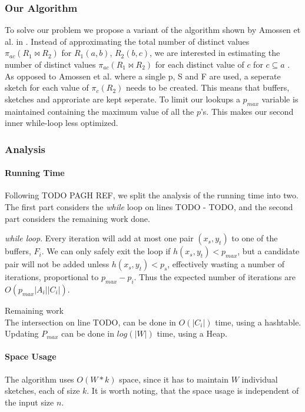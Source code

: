 \documentclass[a4paper,11pt]{article}
\begin{document}
\subsubsection{Our Algorithm}
To solve our problem we propose a variant of the algorithm shown by Amossen et al. in \cite{paper:Amossen}. Instead of approximating the total number of distinct values $\pi_{ac}(R_1 \Join R_2)$ for $R_1(a,b)$, $R_2(b,c)$, we are interested in estimating the number of distinct values $\pi_{ac}(R_1 \Join R_2)$ for each distinct value of $c$ for $c \subseteq a$ . %
As opposed to Amossen et al. where a single p, S and F are used, a seperate sketch for each value of $\pi_c(R_2)$ needs to be created. This means that buffers, sketches and approriate are kept seperate. To limit our lookups a $p_{max}$ variable is maintained containing the maximum value of all the $p$'s. This makes our second inner while-loop less optimized.

\subsubsection{Analysis}
\paragraph {Running Time}
Following TODO PAGH REF, we split the analysis of the running time into two.
The first part considers the \emph{while} loop on lines TODO - TODO, and the second part considers the remaining work done.

\emph{while loop}. Every iteration will add at most one pair $(x_s, y_t)$ to one of the buffers, $F_i$. We can only safely exit the loop if $h(x_s, y_t) < p_{max}$, but a candidate pair will not be added unless $h(x_s, y_t) < p_s$, effectively wasting a number of iterations, proportional to $p_{max}-p_i$. Thus the expected number of iterations are $O(p_{max}|A_i||C_i|)$.

Remaining work\\
The intersection on line TODO, can be done in $O(|C_i|)$ time, using a hashtable.
Updating $P_{max}$ can be done in $log(|W|)$ time, using a Heap.

\paragraph{Space Usage}
The algorithm uses $O(W*k)$ space, since it has to maintain $W$ individual sketches, each of size $k$. It is worth noting, that the space usage is independent of the input size $n$.
\end{document}
